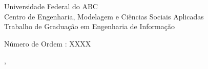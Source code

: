   \begin{capa}%
    \center
	\ABNTEXchapterfont\large{Universidade Federal do ABC \\ Centro de Engenharia, Modelagem e Ciências Sociais Aplicadas \\ Trabalho de Graduação em Engenharia de Informação}

    \vfill
    \ABNTEXchapterfont\bfseries\LARGE\imprimirtitulo
    \vfill

	\ABNTEXchapterfont\large\imprimirautor
	\vfill
%
	Número de Ordem : XXXX
	
    \large\imprimirlocal, \large\imprimirdata

    \vspace*{1cm}
  \end{capa}
